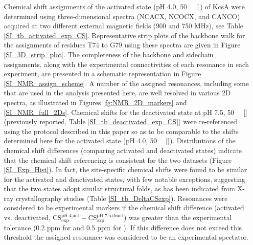 \documentclass[%
 aip,
 amsmath,amssymb,
 preprint,%
]{revtex4-1}
\begin{document}
Chemical shift assignments of the activated state (pH 4.0, \SI{50}{\milli\molar} []) of KcsA were determined using three-dimensional spectra (NCACX, NCOCX, and CANCO) acquired at two different external magnetic fields (900 and 750 MHz), see Table \ref{SI_tb_activated_exp_CS}. Representative strip plots of the backbone walk for the assignments of residues T74 to G79 using these spectra are given in Figure \ref{SI_3D_strip_plot}. The completeness of the backbone and sidechain assignments, along with the experimental connectivities of each resonance in each experiment, are presented in a schematic representation in Figure \ref{SI_NMR_assign_scheme}. A number of the assigned resonances, including some that are used in the analysis presented here, are well resolved in various 2D spectra, as illustrated in Figures \ref{fg:NMR_2D_markers} and \ref{SI_NMR_full_2Ds}. Chemical shifts for the deactivated state at pH 7.5, \SI{50}{\milli\molar} []  (previously reported,\cite{Wylie2014} Table \ref{SI_tb_deactivated_exp_CS}) were re-referenced using the protocol described in this paper so as to be comparable to the shifts determined here for the activated state (pH 4.0, \SI{50}{\milli\molar} []). Distributions of the  chemical shift differences (comparing  activated and deactivated states) indicate that the chemical shift referencing is consistent for the two datasets (Figure \ref{SI_Exp_Hist}). In fact, the site-specific chemical shifts were found to be similar for the activated and deactivated states, with few notable exceptions, suggesting that the two states adopt similar structural folds, as has been indicated from X-ray crystallography studies (Table \ref{SI_tb_DeltaCSexp}). Resonances were considered to be experimental markers if the chemical shift difference (activated vs. deactivated, $\text{CS}_{\text{exp}}^{\text{pH 4,act}} - \text{CS}_{\text{exp}}^{\text{pH 7.5,deact}}$) was greater than the experimental tolerance (0.2 ppm for  and 0.5 ppm for ). If this difference does not exceed this threshold the assigned resonance was considered to be an experimental spectator.
\end{document}
